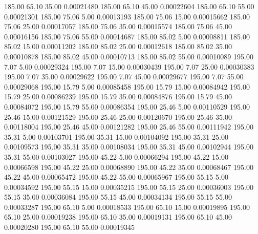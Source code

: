     185.00     65.10     35.00     0.00021480
    185.00     65.10     45.00     0.00022604
    185.00     65.10     55.00     0.00021301
    185.00     75.06      5.00     0.00013193
    185.00     75.06     15.00     0.00015662
    185.00     75.06     25.00     0.00017057
    185.00     75.06     35.00     0.00015574
    185.00     75.06     45.00     0.00016156
    185.00     75.06     55.00     0.00014687
    185.00     85.02      5.00     0.00008811
    185.00     85.02     15.00     0.00011202
    185.00     85.02     25.00     0.00012618
    185.00     85.02     35.00     0.00010878
    185.00     85.02     45.00     0.00010713
    185.00     85.02     55.00     0.00010089
    195.00      7.07      5.00     0.00029324
    195.00      7.07     15.00     0.00030439
    195.00      7.07     25.00     0.00030383
    195.00      7.07     35.00     0.00029622
    195.00      7.07     45.00     0.00029677
    195.00      7.07     55.00     0.00029068
    195.00     15.79      5.00     0.00085458
    195.00     15.79     15.00     0.00084942
    195.00     15.79     25.00     0.00086239
    195.00     15.79     35.00     0.00084876
    195.00     15.79     45.00     0.00084072
    195.00     15.79     55.00     0.00086354
    195.00     25.46      5.00     0.00110529
    195.00     25.46     15.00     0.00121529
    195.00     25.46     25.00     0.00120670
    195.00     25.46     35.00     0.00118004
    195.00     25.46     45.00     0.00121282
    195.00     25.46     55.00     0.00111942
    195.00     35.31      5.00     0.00103701
    195.00     35.31     15.00     0.00104092
    195.00     35.31     25.00     0.00109573
    195.00     35.31     35.00     0.00108034
    195.00     35.31     45.00     0.00102944
    195.00     35.31     55.00     0.00103027
    195.00     45.22      5.00     0.00066294
    195.00     45.22     15.00     0.00066598
    195.00     45.22     25.00     0.00068890
    195.00     45.22     35.00     0.00068467
    195.00     45.22     45.00     0.00065472
    195.00     45.22     55.00     0.00065967
    195.00     55.15      5.00     0.00034592
    195.00     55.15     15.00     0.00035215
    195.00     55.15     25.00     0.00036003
    195.00     55.15     35.00     0.00036084
    195.00     55.15     45.00     0.00034134
    195.00     55.15     55.00     0.00033287
    195.00     65.10      5.00     0.00018533
    195.00     65.10     15.00     0.00019895
    195.00     65.10     25.00     0.00019238
    195.00     65.10     35.00     0.00019131
    195.00     65.10     45.00     0.00020280
    195.00     65.10     55.00     0.00019345
